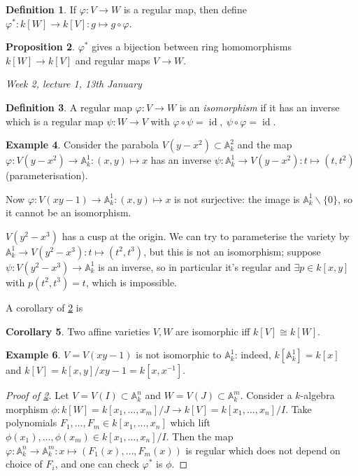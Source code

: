 \documentclass{article}
\newcommand{\A}{\mathbb{A}}
\newcommand{\id}{\operatorname{id}}
\theoremstyle{definition}
\newtheorem{defn}{Definition}[subsection]
\newtheorem{prop}[defn]{Proposition}
\newtheorem{coro}[defn]{Corollary}
\newtheorem{example}[defn]{Example}
\begin{document}
\begin{defn}
If $\varphi:V\rightarrow W$ is a regular map, then define $\varphi^\ast:k[W]\rightarrow k[V]:g\mapsto g\circ \varphi$.
\end{defn}

\begin{prop}
\label{prop:phistargivesbi}
$\varphi^\ast$ gives a bijection between ring homomorphisms $k[W]\rightarrow k[V]$ and regular maps $V\rightarrow W$.
\end{prop}

\begin{flushright}
\textit{Week 2, lecture 1, 13th January}
\end{flushright}

\begin{defn}
A regular map $\varphi:V\rightarrow W$ is an \textit{isomorphism} if it has an inverse which is a regular map $\psi:W\rightarrow V$ with $\varphi\circ\psi=\id,\ \psi\circ\varphi=\id$.
\end{defn}
\begin{example}
Consider the parabola $V(y-x^2)\subset\A_k^2$ and the map $\varphi:V(y-x^2)\rightarrow\A_k^1:(x,y)\mapsto x$ has an inverse $\psi:\A_k^1\rightarrow V(y-x^2):t\mapsto(t,t^2)$ (parameterisation).

Now $\varphi:V(xy-1)\rightarrow\A_k^1:(x,y)\mapsto x$ is not surjective: the image is $\A_k^1\backslash\{0\}$, so it cannot be an isomorphism.

$V(y^2-x^3)$ has a cusp at the origin. We can try to parameterise the variety by $\A_k^1\rightarrow V(y^2-x^3):t\mapsto (t^2,t^3)$, but this is not an isomorphism; suppose $\psi:V(y^2-x^3)\rightarrow\A_k^1$ is an inverse, so in particular it's regular and $\exists p\in k[x,y]$ with $p(t^2,t^3)=t$, which is impossible.
\end{example}

A corollary of \ref{prop:phistargivesbi} is
\begin{coro}
Two affine varieties $V,W$ are isomorphic iff $k[V]\cong k[W]$.
\end{coro}
\begin{example}
$V=V(xy-1)$ is not isomorphic to $\A_k^1$: indeed, $k[\A_k^1]=k[x]$ and $k[V]=k[x,y]/xy-1=k[x,x^{-1}]$.
\end{example}

\begin{proof}[Proof of \ref{prop:phistargivesbi}]
Let $V=V(I)\subset\A_k^n$ and $W=V(J)\subset\A_k^m$. Consider a $k$-algebra morphism $\phi: k[W]=k[x_1,\ldots,x_m]/J\rightarrow k[V]=k[x_1,\ldots,x_n]/I$. Take polynomials $F_1,\ldots,F_m\in k[x_1,\ldots,x_n]$ which lift $\phi(x_1),\ldots,\phi(x_m)\in k[x_1,\ldots,x_n]/I$. Then the map $\varphi:\A_k^n\rightarrow\A_k^m:x\mapsto(F_1(x),\ldots,F_m(x))$ is regular which does not depend on choice of $F_i$, and one can check $\varphi^\ast$ is $\phi$.
\end{proof}
\end{document}
